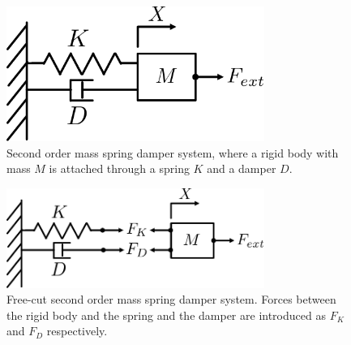 \begin{figure}
   \centering
   \includegraphics[width=0.75\textwidth]{images/mass_spring_damper.pdf}
   \caption{Second order mass spring damper system, where a rigid body with mass $M$ is attached through a spring $K$ and a damper $D$.}
   \label{pics:mass_spring_damper}
\end{figure}

\begin{figure}
   \centering
   \includegraphics[width=0.75\textwidth]{images/mass_spring_damper_freecut.pdf}
   \caption{Free-cut second order mass spring damper system. Forces between the rigid body and the spring and the damper are introduced as $F_K$ and $F_D$ respectively.}
   \label{pics:mass_spring_damper_freecut}
\end{figure}
%
%
%
%
%
%


